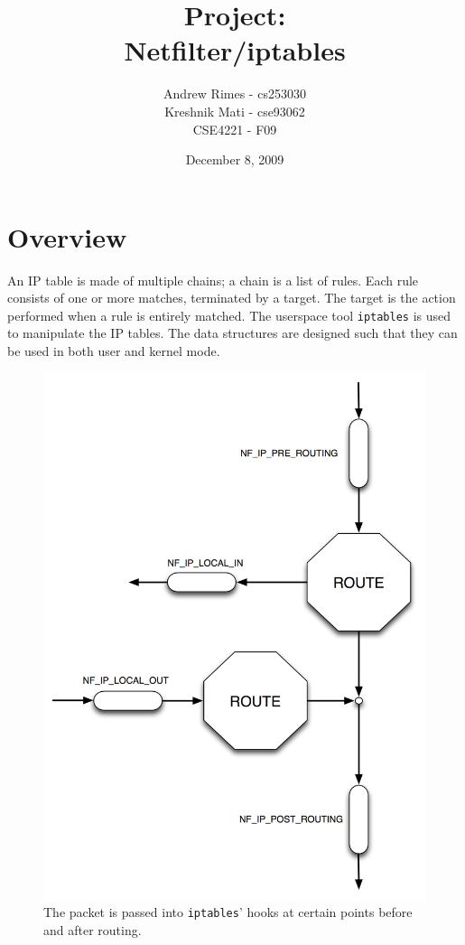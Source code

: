 \documentclass[a4paper,10pt]{article}
\newcommand{\code}[1]{\texttt{#1}}
\begin{document}
\title{\textbf{Project}:\\Netfilter/iptables}
\author{Andrew Rimes - cs253030\\Kreshnik Mati - cse93062\\CSE4221 - F09}
\date{December 8, 2009}

\maketitle
\thispagestyle{empty} 

\newpage

\setcounter{tocdepth}{3}
\tableofcontents


\newpage

\section{Overview}

An IP table is made of multiple chains; a chain is a list of
rules. Each rule consists of one or more matches, terminated by a
target. The target is the action performed when a rule is entirely
matched. The userspace tool \code{iptables} is used to manipulate the IP
tables. The data structures are designed such that they can be used in
both user and kernel mode.


\begin{figure}
\centering
\includegraphics[totalheight=0.40\textheight]{images/hooks.png}
\caption{The packet is passed into \code{iptables}' hooks at certain points
  before and after routing.}\label{fig:hooks}
\end{figure}
\end{document}
